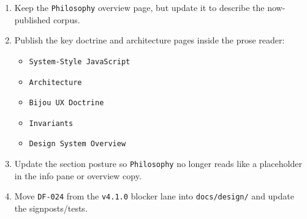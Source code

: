 \begin{enumerate}
\def\labelenumi{\arabic{enumi}.}
\tightlist
\item
  Keep the \texttt{P\allowbreak{}h\allowbreak{}i\allowbreak{}l\allowbreak{}o\allowbreak{}s\allowbreak{}o\allowbreak{}p\allowbreak{}h\allowbreak{}y} overview page, but update it to describe the now-published corpus.
\item
  Publish the key doctrine and architecture pages inside the prose reader:

  \begin{itemize}
  \tightlist
  \item
    \texttt{S\allowbreak{}y\allowbreak{}s\allowbreak{}t\allowbreak{}e\allowbreak{}m\allowbreak{}-\allowbreak{}S\allowbreak{}t\allowbreak{}y\allowbreak{}l\allowbreak{}e\allowbreak{} \allowbreak{}J\allowbreak{}a\allowbreak{}v\allowbreak{}a\allowbreak{}S\allowbreak{}c\allowbreak{}r\allowbreak{}i\allowbreak{}p\allowbreak{}t}
  \item
    \texttt{A\allowbreak{}r\allowbreak{}c\allowbreak{}h\allowbreak{}i\allowbreak{}t\allowbreak{}e\allowbreak{}c\allowbreak{}t\allowbreak{}u\allowbreak{}r\allowbreak{}e}
  \item
    \texttt{B\allowbreak{}i\allowbreak{}j\allowbreak{}o\allowbreak{}u\allowbreak{} \allowbreak{}U\allowbreak{}X\allowbreak{} \allowbreak{}D\allowbreak{}o\allowbreak{}c\allowbreak{}t\allowbreak{}r\allowbreak{}i\allowbreak{}n\allowbreak{}e}
  \item
    \texttt{I\allowbreak{}n\allowbreak{}v\allowbreak{}a\allowbreak{}r\allowbreak{}i\allowbreak{}a\allowbreak{}n\allowbreak{}t\allowbreak{}s}
  \item
    \texttt{D\allowbreak{}e\allowbreak{}s\allowbreak{}i\allowbreak{}g\allowbreak{}n\allowbreak{} \allowbreak{}S\allowbreak{}y\allowbreak{}s\allowbreak{}t\allowbreak{}e\allowbreak{}m\allowbreak{} \allowbreak{}O\allowbreak{}v\allowbreak{}e\allowbreak{}r\allowbreak{}v\allowbreak{}i\allowbreak{}e\allowbreak{}w}
  \end{itemize}
\item
  Update the section posture so \texttt{P\allowbreak{}h\allowbreak{}i\allowbreak{}l\allowbreak{}o\allowbreak{}s\allowbreak{}o\allowbreak{}p\allowbreak{}h\allowbreak{}y} no longer reads like a placeholder in the info pane or overview copy.
\item
  Move \texttt{D\allowbreak{}F\allowbreak{}-\allowbreak{}0\allowbreak{}2\allowbreak{}4} from the \texttt{v\allowbreak{}4\allowbreak{}.\allowbreak{}1\allowbreak{}.\allowbreak{}0} blocker lane into \texttt{d\allowbreak{}o\allowbreak{}c\allowbreak{}s\allowbreak{}/\allowbreak{}d\allowbreak{}e\allowbreak{}s\allowbreak{}i\allowbreak{}g\allowbreak{}n\allowbreak{}/} and update the signposts/tests.
\end{enumerate}

